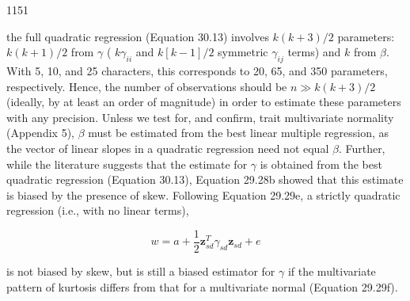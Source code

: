 \documentclass{article}
\begin{document}
1151

the full quadratic regression (Equation 30.13) involves  $ k(k+3)/2 $ parameters:  $ k(k+1)/2 $ from  $ \gamma $ ( $ k \gamma_{ii} $ and  $ k[k-1]/2 $ symmetric  $ \gamma_{ij} $ terms) and  $ k $ from  $ \beta $. With 5, 10, and 25 characters, this corresponds to 20, 65, and 350 parameters, respectively. Hence, the number of observations should be  $ n \gg k(k+3)/2 $ (ideally, by at least an order of magnitude) in order to estimate these parameters with any precision. Unless we test for, and confirm, trait multivariate normality (Appendix 5),  $ \beta $ must be estimated from the best linear multiple regression, as the vector of linear slopes in a quadratic regression need not equal  $ \beta $. Further, while the literature suggests that the estimate for  $ \gamma $ is obtained from the best quadratic regression (Equation 30.13), Equation 29.28b showed that this estimate is biased by the presence of skew. Following Equation 29.29e, a strictly quadratic regression (i.e., with no linear terms),

\begin{equation}
w=a+\frac{1}{2}\mathbf{z}_{sd}^{T}\gamma_{sd}\mathbf{z}_{sd}+e
\end{equation}

is not biased by skew, but is still a biased estimator for  $ \gamma $ if the multivariate pattern of kurtosis differs from that for a multivariate normal (Equation 29.29f).
\end{document}
